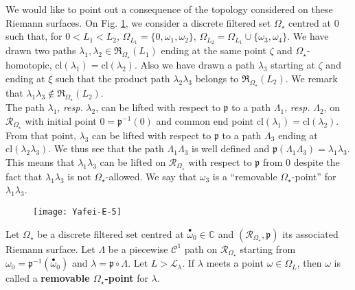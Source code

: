 \documentclass[11pt, english]{smfart}
\theoremstyle{definition}
\begin{document}
We would like to point out a consequence of the topology considered on
these Riemann surfaces.
On Fig. \ref{Yafei-E-5}, we consider  a  discrete
    filtered set $\Omega_\star$  centred at $0$ such that, for $0 <
    L_1 < L_2$,  $\Omega_{L_1} = 
    \{0,\omega_1, \omega_2\}$, $\Omega_{L_2} = \Omega_{L_1} \cup
    \{\omega_3, \omega_4\}$. We have drawn two paths  $\lambda_1, \lambda_2 \in
    \mathfrak{R}_{\Omega_\star}(L_1)$ ending at the same point
    $\zeta$ and
    $\Omega_\star$-homotopic, $\mathrm{cl}(\lambda_1) = \mathrm{cl}(\lambda_2)$. Also we
    have drawn a path $\lambda_3$ starting at $\zeta$ and ending at
    $\xi$   such that the  product path $\lambda_2\lambda_3$ belongs to
    $\mathfrak{R}_{\Omega_\star}(L_2)$. We remark that
    $\lambda_1\lambda_3 \notin  \mathfrak{R}_{\Omega_\star}(L_2)$. \\
The path $\lambda_1$, {\em resp.}  $\lambda_2$, can be lifted with
respect to  $\mathfrak{p}$ to a path $\Lambda_1$, {\em resp.}  $\Lambda_2$, on
$\mathscr{R}_{\Omega_\star}$ with initial point $0=
\mathfrak{p}^{-1}(0)$ 
and common end point $\mathrm{cl}(\lambda_1) = \mathrm{cl}(\lambda_2)$. From
that point, $\lambda_3$ can be lifted with
respect to  $\mathfrak{p}$ to a path $\Lambda_3$ ending at $ \mathrm{cl}(\lambda_2
\lambda_3)$. We thus see that the path $\Lambda_1 \Lambda_3$ is well
defined and $\mathfrak{p}(\Lambda_1 \Lambda_3) = \lambda_1
\lambda_3$. This means that $\lambda_1 \lambda_3$ can be lifted on
$\mathscr{R}_{\Omega_\star}$ with
respect to  $\mathfrak{p}$ from  $0$ despite the fact that
$\lambda_1\lambda_3$ is not $\Omega_\star$-allowed. We say that
$\omega_3$ is a ``removable $\Omega_\star$-point'' for $\lambda_1\lambda_3$.

\begin{figure}[thp]
\centering\texttt{[image: Yafei-E-5]}\\
  \centering\caption{
  }\label{Yafei-E-5}
\end{figure}

\begin{defi}\label{removablepoint}
Let $\Omega_\star$  be a discrete filtered set centred at
${ {\stackrel{\bullet}{\omega}} }_0 \in \mathbb{C}$ and
$(\mathscr{R}_{\Omega_\star},\mathfrak{p})$ its associated Riemann
surface. Let $\Lambda$ be a piecewise $\mathcal{C}^1$ path on $\mathscr{R}_{\Omega_\star}$
starting from $\omega_0 = \mathfrak{p}^{-1}({ {\stackrel{\bullet}{\omega}} }_0)$ and $\lambda =
\mathfrak{p} \circ \Lambda$. Let $L>\mathcal{L}_{\lambda}$. If $\lambda$
meets a point $\omega \in \Omega_L$, then $\omega$ is called a
\textbf{removable $\Omega_\star$-point} for $\lambda$.
\end{defi}
\end{document}
